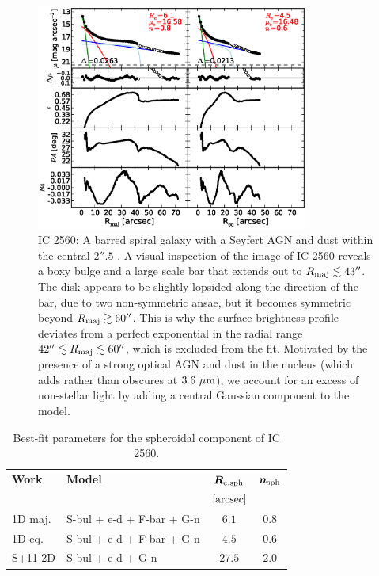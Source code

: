 \documentclass[preprint2]{emulateapj}
\newcommand{\fitfigurewidth}{0.8\textwidth}
\begin{document}
  \begin{figure}[h]
  \begin{center}
  \includegraphics[width=\fitfigurewidth]{ic2560_1Dfit.eps}
  \caption{IC 2560: A barred spiral galaxy with a Seyfert AGN \citep{veroncettyveron2006}
  and dust within the central $2''.5$ \citep{martini2003}.
  A visual inspection of the image of IC 2560 reveals a boxy bulge and
  a large scale bar that extends out to $R_{\rm maj} \lesssim 43''$.
  The disk appears to be slightly lopsided along the direction of the bar,
  due to two non-symmetric ansae, but it becomes symmetric beyond $R_{\rm maj} \gtrsim 60''$. 
  This is why the surface brightness profile deviates from a perfect exponential
  in the radial range $42'' \lesssim R_{\rm maj} \lesssim 60''$, which is excluded from the fit.
  Motivated by the presence of a strong optical AGN and dust in the nucleus (which adds rather than obscures at $3.6\rm~\mu m$), 
  we account for an excess of non-stellar light by adding a central Gaussian component to the model.}
  \end{center}
  \end{figure}

  \begin{table}[h]
  \small
  \caption{Best-fit parameters for the spheroidal component of IC 2560.}
  \begin{center}
  \begin{tabular}{llcc}
  \hline
  {\bf Work} & {\bf Model}   & $\bm R_{\rm e,sph}$    & $\bm n_{\rm sph}$ \\
    &  &  $[\rm arcsec]$ & \\
  \hline
  1D maj. & S-bul + e-d + F-bar + G-n & $6.1$  &  $0.8$ \\
  1D eq.  & S-bul + e-d + F-bar + G-n & $4.5$  &  $0.6$ \\
  \hline
  S+11 2D         & S-bul + e-d + G-n & $27.5$  &  $2.0$ \\
  \hline
  \end{tabular}
  \end{center}
  \label{tab:ic2560}
  \end{table}
\end{document}

